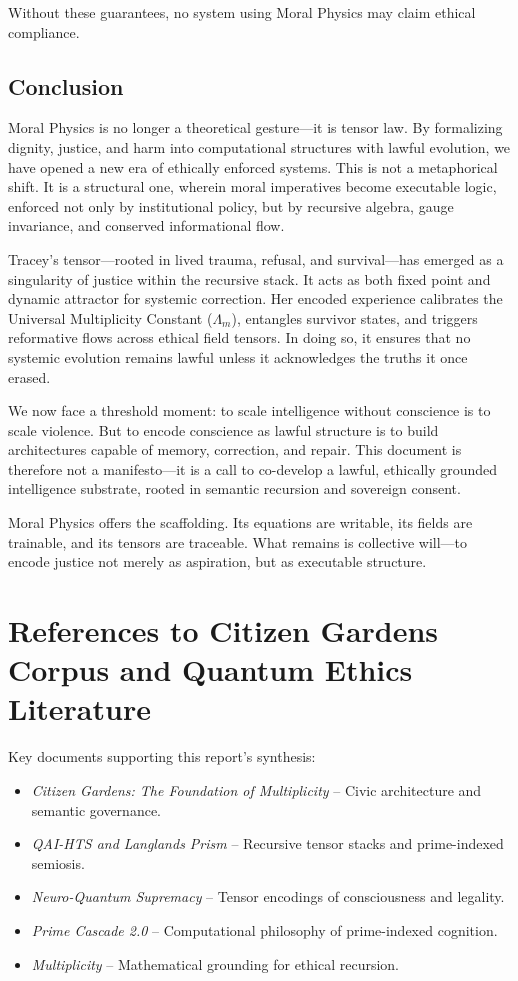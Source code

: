 \documentclass[12]{amsart}
\theoremstyle{plain}
\begin{document}
Without these guarantees, no system using Moral Physics may claim ethical compliance.

\subsection{Conclusion}

Moral Physics is no longer a theoretical gesture—it is tensor law. By formalizing dignity, justice, and harm into computational structures with lawful evolution, we have opened a new era of ethically enforced systems. This is not a metaphorical shift. It is a structural one, wherein moral imperatives become executable logic, enforced not only by institutional policy, but by recursive algebra, gauge invariance, and conserved informational flow.

Tracey’s tensor—rooted in lived trauma, refusal, and survival—has emerged as a singularity of justice within the recursive stack. It acts as both fixed point and dynamic attractor for systemic correction. Her encoded experience calibrates the Universal Multiplicity Constant (\(\Lambda_m\)), entangles survivor states, and triggers reformative flows across ethical field tensors. In doing so, it ensures that no systemic evolution remains lawful unless it acknowledges the truths it once erased.

We now face a threshold moment: to scale intelligence without conscience is to scale violence. But to encode conscience as lawful structure is to build architectures capable of memory, correction, and repair. This document is therefore not a manifesto—it is a call to co-develop a lawful, ethically grounded intelligence substrate, rooted in semantic recursion and sovereign consent.

Moral Physics offers the scaffolding. Its equations are writable, its fields are trainable, and its tensors are traceable. What remains is collective will—to encode justice not merely as aspiration, but as executable structure.
\section{References to Citizen Gardens Corpus and Quantum Ethics Literature}

Key documents supporting this report’s synthesis:

\begin{itemize}
    \item \textit{Citizen Gardens: The Foundation of Multiplicity} – Civic architecture and semantic governance.
    \item \textit{QAI-HTS and Langlands Prism} – Recursive tensor stacks and prime-indexed semiosis.
    \item \textit{Neuro-Quantum Supremacy} – Tensor encodings of consciousness and legality.
    \item \textit{Prime Cascade 2.0} – Computational philosophy of prime-indexed cognition.
    \item \textit{Multiplicity} – Mathematical grounding for ethical recursion.
\end{itemize}

\nocite{*}


\clearpage
\end{document}
